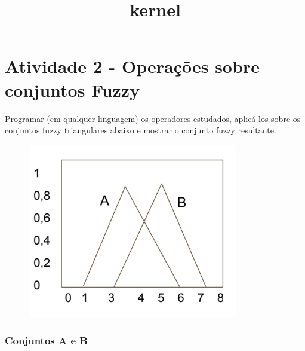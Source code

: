 \documentclass[11pt]{article}
\title{kernel}
\makeatletter
\def\maxwidth{\ifdim\Gin@nat@width>\linewidth\linewidth
    \else\Gin@nat@width\fi}
\let\Oldincludegraphics\includegraphics
\renewcommand{\includegraphics}[1]{\Oldincludegraphics[width=.8\maxwidth]{#1}}
\makeatother
\begin{document}
    
    
    \maketitle
    
    

    
    \section{Atividade 2 - Operações sobre conjuntos
Fuzzy}\label{atividade-2---operauxe7uxf5es-sobre-conjuntos-fuzzy}

Programar (em qualquer linguagem) os operadores estudados, aplicá-los
sobre os conjuntos fuzzy triangulares abaixo e mostrar o conjunto fuzzy
resultante.

\begin{figure}[htbp]
\centering
\includegraphics{img/conjunto.png}
\caption{}
\end{figure}

    \subsubsection{Conjuntos A e B}\label{conjuntos-a-e-b}
\end{document}
